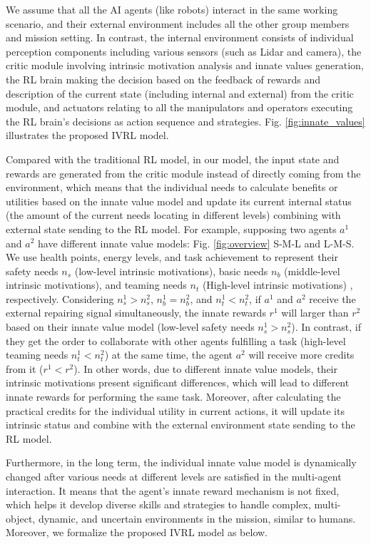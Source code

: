 \documentclass[letterpaper]{article} %
\begin{document}
We assume that all the AI agents (like robots) interact in the same working scenario, and their external environment includes all the other group members and mission setting. In contrast, the internal environment consists of individual perception components including various sensors (such as Lidar and camera), the critic module involving intrinsic motivation analysis and innate values generation, the RL brain making the decision based on the feedback of rewards and description of the current state (including internal and external) from the critic module, and actuators relating to all the manipulators and operators executing the RL brain's decisions as action sequence and strategies. Fig. \ref{fig:innate_values} illustrates the proposed IVRL model.

Compared with the traditional RL model, in our model, the input state and rewards are generated from the critic module instead of directly coming from the environment, which means that the individual needs to calculate benefits or utilities based on the innate value model and update its current internal status (the amount of the current needs locating in different levels) combining with external state sending to the RL model. For example, supposing two agents $a^1$ and $a^2$ have different innate value models: Fig. \ref{fig:overview} S-M-L and L-M-S. We use health points, energy levels, and task achievement to represent their safety needs $n_s$ (low-level intrinsic motivations), basic needs $n_b$ (middle-level intrinsic motivations), and teaming needs $n_t$ (High-level intrinsic motivations) \cite{yang2020needs,yang2021can,10.1145/3555776.3577642}, respectively. Considering $n_s^1 > n_s^2$, $n_b^1 = n_b^2$, and $n_t^1 < n_t^2$, if $a^1$ and $a^2$ receive the external repairing signal simultaneously, the innate rewards $r^1$ will larger than $r^2$ based on their innate value model (low-level safety needs $n_s^1 > n_s^2$). In contrast, if they get the order to collaborate with other agents fulfilling a task (high-level teaming needs $n_t^1 < n_t^2$) at the same time, the agent $a^2$ will receive more credits from it ($r^1 < r^2$). In other words, due to different innate value models, their intrinsic motivations present significant differences, which will lead to different innate rewards for performing the same task. Moreover, after calculating the practical credits for the individual utility in current actions, it will update its intrinsic status and combine with the external environment state sending to the RL model.

Furthermore, in the long term, the individual innate value model is dynamically changed after various needs at different levels are satisfied in the multi-agent interaction. It means that the agent's innate reward mechanism is not fixed, which helps it develop diverse skills and strategies to handle complex, multi-object, dynamic, and uncertain environments in the mission, similar to humans. Moreover, we formalize the proposed IVRL model as below.
\end{document}
